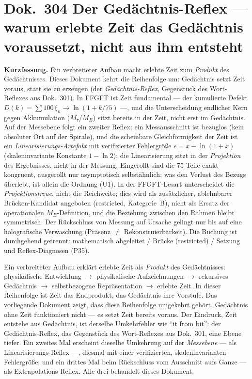 
\section*{Dok.~304 \quad Der Gedächtnis-Reflex --- warum erlebte Zeit das Gedächtnis
voraussetzt, nicht aus ihm entsteht}

\begingroup\small\noindent
\textbf{Kurzfassung.} Ein verbreiteter Aufbau macht erlebte Zeit zum \emph{Produkt} des
Gedächtnisses. Dieses Dokument kehrt die Reihenfolge um: Gedächtnis setzt Zeit voraus, statt
sie zu erzeugen (der \emph{Gedächtnis-Reflex}, Gegenstück des Wort-Reflexes aus Dok.~301). In
FFGFT ist Zeit fundamental --- der kumulierte Defekt $D(k)=\sum 100\,\xi_n\to\ln(1+k/75)$ ---,
und die Unterscheidung endlicher Kern gegen Akkumulation ($M_\tau$/$M_B$) sitzt bereits in der
Zeit, nicht erst im Gedächtnis. Auf der Messebene folgt ein zweiter Reflex: ein
Messausschnitt ist bezuglos (kein absoluter Ort auf der Spirale), und die scheinbare
Gleichförmigkeit der Zeit ist ein \emph{Linearisierungs-Artefakt} mit verifizierter
Fehlergröße $e=x-\ln(1+x)$ (skaleninvariante Konstante $1-\ln 2$); die Linearisierung sitzt in
der \emph{Projektion} des Ergebnisses, nicht in der Messung. Eingerollt sind die 75 Teile
exakt kongruent, ausgerollt nur asymptotisch selbstähnlich; was den Verlust des Bezugs
überlebt, ist allein die Ordnung (U1). In der FFGFT-Lesart unterscheidet die \emph{Projektionstreue}, nicht die Reichweite; dies
wird als zusätzlicher, ablehnbarer Brücken-Kandidat angeboten (restricted, Kategorie~B), nicht
als Ersatz der operationalen $M_B$-Definition, und die Beziehung zwischen den Rahmen bleibt
symmetrisch. Der Rückschluss von Messung auf Ursache gelingt nur bis auf
eine holografische Verwaschung (Präsenz $\neq$ Rekonstruierbarkeit). Die Buchung ist
durchgehend getrennt: mathematisch abgeleitet / Brücke (restricted) / Setzung und
Reflex-Diagnosen (P35).
\par\endgroup

\medskip

Ein verbreiteter Aufbau erklärt erlebte Zeit als \emph{Produkt} des Gedächtnisses:
physikalische Entwicklung $\to$ physikalische Aufzeichnungen $\to$ rekursives Gedächtnis
$\to$ selbstbezogene Repräsentation $\to$ erlebte Zeit. In dieser Reihenfolge ist Zeit das
Endprodukt, das Gedächtnis ihre Vorstufe. Das vorliegende Dokument zeigt, dass diese
Reihenfolge umgekehrt gehört. Gedächtnis ohne Zeit funktioniert nicht --- es setzt Zeit
bereits voraus. Der Eindruck, Zeit entstehe aus Gedächtnis, ist derselbe Umkehrfehler wie
\enquote{it from bit}: der Gedächtnis-Reflex, das Gegenstück des Wort-Reflexes aus
Dok.~301, eine Ebene tiefer. Ein zweites Mal erscheint dieselbe Umkehrung auf der
\emph{Messebene} --- als Linearisierungs-Reflex ---, diesmal mit einer verifizierten,
skaleninvarianten Fehlergröße; und ein drittes Mal beim Rückschluss vom Ausschnitt aufs
Ganze --- als Extrapolations-Reflex. Alle drei behandelt dieses Dokument.

